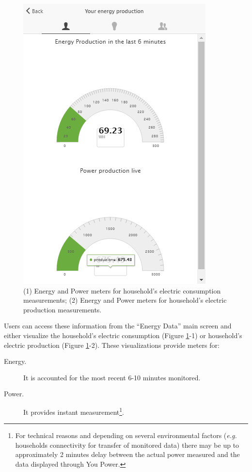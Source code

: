 \begin{figure}[htb]
\begin{center}
\begin{minipage}[htb]{0.45\linewidth}
         \includegraphics[width=1\linewidth]{img/visual_production.png}  
        \end{minipage}
      \end{center}
    \caption{(1) Energy and Power meters for household's electric consumption measurements; (2) Energy and Power meters for household's electric production measurements.
}
\label{fig:viz_rt}
\end{figure}

Users can access these information from the ``Energy Data'' main screen and either visualize the household's electric consumption (Figure \ref{fig:viz_rt}-1) or
household's electric production (Figure \ref{fig:viz_rt}-2).
These visualizations provide meters for:
\begin{description}
 \item[Energy.] It is accounted for the most recent 6-10 minutes monitored.
 \item[Power.] It provides instant measurement\footnote{For technical reasons and depending on several environmental factors (\textit{e.g.} households connectivity for transfer of monitored data) there may be up to approximately 2 minutes delay between the actual power measured and the data displayed through You Power.}.
\end{description}



